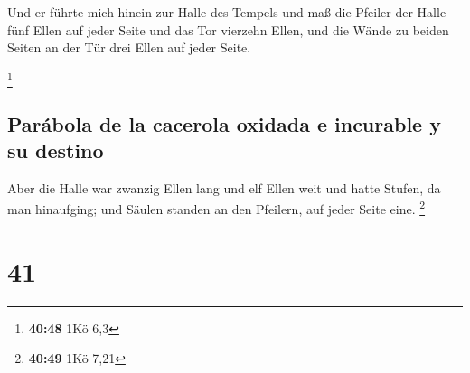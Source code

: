  Und er führte mich hinein zur Halle des Tempels und maß
die Pfeiler der Halle fünf Ellen auf jeder Seite und das Tor vierzehn
Ellen, und die Wände zu beiden Seiten an der Tür drei Ellen auf jeder
Seite.

\footnote{\textbf{40:48} 1Kö 6,3}

\hypertarget{paruxe1bola-de-la-cacerola-oxidada-e-incurable-y-su-destino}{%
\subsection{Parábola de la cacerola oxidada e incurable y su
destino}\label{paruxe1bola-de-la-cacerola-oxidada-e-incurable-y-su-destino}}

 Aber die Halle war zwanzig Ellen lang und elf Ellen weit
und hatte Stufen, da man hinaufging; und Säulen standen an den Pfeilern,
auf jeder Seite eine. \footnote{\textbf{40:49} 1Kö 7,21}

\hypertarget{section-40}{%
\section{41}\label{section-40}}

